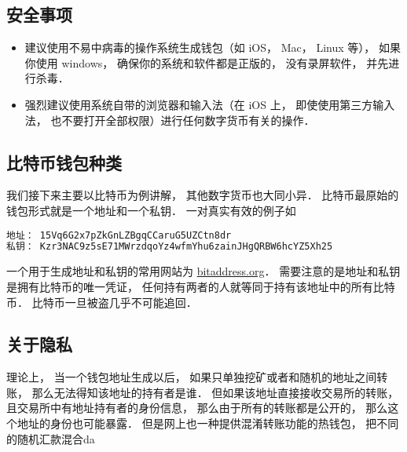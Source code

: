 
\subsection{安全事项}
\begin{itemize}
\item 建议使用不易中病毒的操作系统生成钱包（如 iOS， Mac， Linux 等）， 如果你使用 windows， 确保你的系统和软件都是正版的， 没有录屏软件， 并先进行杀毒．
\item 强烈建议使用系统自带的浏览器和输入法（在 iOS 上， 即使使用第三方输入法， 也不要打开全部权限）进行任何数字货币有关的操作．
\end{itemize}

\subsection{比特币钱包种类}
我们接下来主要以比特币为例讲解， 其他数字货币也大同小异． 比特币最原始的钱包形式就是一个地址和一个私钥． 一对真实有效的例子如
\begin{lstlisting}[language=bash]
地址： 15Vq6G2x7pZkGnLZBgqCCaruG5UZCtn8dr
私钥： Kzr3NAC9z5sE71MWrzdqoYz4wfmYhu6zainJHgQRBW6hcYZ5Xh25
\end{lstlisting}
一个用于生成地址和私钥的常用网站为 \href{https://www.bitaddress.org/}{bitaddress.org}． 需要注意的是地址和私钥是拥有比特币的唯一凭证， 任何持有两者的人就等同于持有该地址中的所有比特币． 比特币一旦被盗几乎不可能追回．

\subsection{关于隐私}
理论上， 当一个钱包地址生成以后， 如果只单独挖矿或者和随机的地址之间转账， 那么无法得知该地址的持有者是谁． 但如果该地址直接接收交易所的转账， 且交易所中有地址持有者的身份信息， 那么由于所有的转账都是公开的， 那么这个地址的身份也可能暴露． 但是网上也一种提供混淆转账功能的热钱包， 把不同的随机汇款混合da


